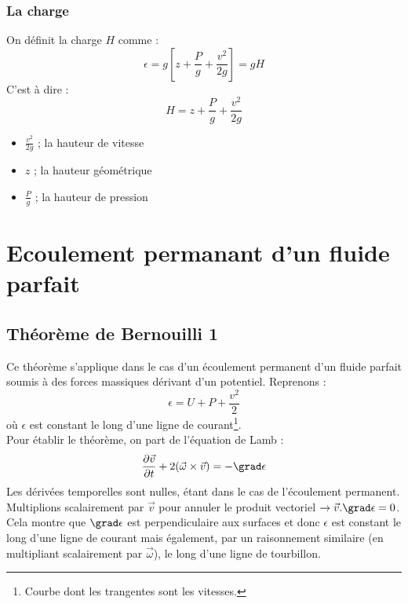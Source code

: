 		\subsubsection{La charge}
		On définit la charge $H$ comme :
		\begin{equation}
		\epsilon = g\left[z+\frac{P}{g}+\frac{v^2}{2g}\right] = gH
		\end{equation}
		C'est à dire :
		\begin{equation}
		H = z + \frac{P}{g}+\frac{v^2}{2g}
		\end{equation}
		\begin{itemize}
		\item $\frac{v^2}{2g}$ ; la hauteur de vitesse
		\item $z$ ; la hauteur géométrique
		\item $\frac{P}{g}$ ; la hauteur de pression
		\end{itemize}

	
\section{Ecoulement permanant d'un fluide parfait}
	\subsection{Théorème de Bernouilli 1}
	Ce théorème s'applique dans le cas d'un écoulement permanent d'un fluide parfait 
	soumis à des forces massiques dérivant d'un potentiel. Reprenons :
	\begin{equation}
	\epsilon = U + P + \frac{v^2}{2}
	\end{equation}
	où $\epsilon$ est constant le long d'une ligne de courant\footnote{Courbe dont les
	trangentes sont les vitesses.}.\\
	
	Pour établir le théorème, on part de l'équation de Lamb :
	\begin{equation}
	\frac{\partial\vec{v}}{\partial t} + 2(\vec{\omega}\times\vec{v}) = -\grad \epsilon
	\end{equation}
	Les dérivées temporelles sont nulles, étant dans le cas de l'écoulement permanent.
	Multiplions scalairement par $\vec{v}$ pour annuler le produit vectoriel $\rightarrow
	\vec{v}.\grad \epsilon = 0$. Cela montre que $\grad \epsilon$ est perpendiculaire
	aux surfaces et donc $\epsilon$ est constant le long d'une ligne de courant mais
	également, par un raisonnement similaire (en multipliant scalairement par $\vec{
	\omega}$), le long d'une ligne de tourbillon.
		
